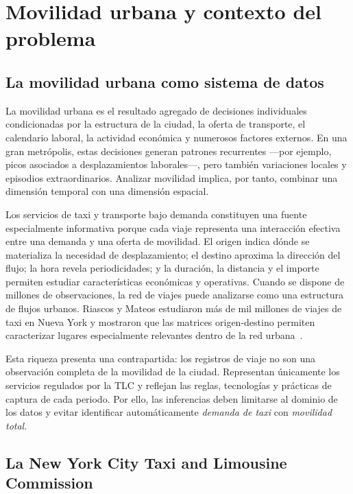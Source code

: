 \chapter{Movilidad urbana y contexto del problema}\label{chap:contexto}

\section{La movilidad urbana como sistema de datos}

La movilidad urbana es el resultado agregado de decisiones individuales condicionadas por la estructura de la ciudad, la oferta de transporte, el calendario laboral, la actividad económica y numerosos factores externos. En una gran metrópolis, estas decisiones generan patrones recurrentes ---por ejemplo, picos asociados a desplazamientos laborales---, pero también variaciones locales y episodios extraordinarios. Analizar movilidad implica, por tanto, combinar una dimensión temporal con una dimensión espacial.

Los servicios de taxi y transporte bajo demanda constituyen una fuente especialmente informativa porque cada viaje representa una interacción efectiva entre una demanda y una oferta de movilidad. El origen indica dónde se materializa la necesidad de desplazamiento; el destino aproxima la dirección del flujo; la hora revela periodicidades; y la duración, la distancia y el importe permiten estudiar características económicas y operativas. Cuando se dispone de millones de observaciones, la red de viajes puede analizarse como una estructura de flujos urbanos. Riascos y Mateos estudiaron más de mil millones de viajes de taxi en Nueva York y mostraron que las matrices origen-destino permiten caracterizar lugares especialmente relevantes dentro de la red urbana~\cite{riascos2020}.

Esta riqueza presenta una contrapartida: los registros de viaje no son una observación completa de la movilidad de la ciudad. Representan únicamente los servicios regulados por la TLC y reflejan las reglas, tecnologías y prácticas de captura de cada periodo. Por ello, las inferencias deben limitarse al dominio de los datos y evitar identificar automáticamente \textit{demanda de taxi} con \textit{movilidad total}.

\section{La New York City Taxi and Limousine Commission}

